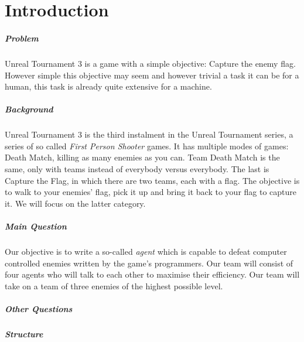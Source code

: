 \chapter*{Introduction}
\paragraph{Problem}
Unreal Tournament 3 is a game with a simple objective: Capture the enemy flag. However simple this objective may seem and however trivial a task it can be for a human, this task is already quite extensive for a machine.
\paragraph{Background}
Unreal Tournament 3 is the third instalment in the Unreal Tournament series, a series of so called \emph{First Person Shooter} games. It has multiple modes of games: Death Match, killing as many enemies as you can. Team Death Match is the same, only with teams instead of everybody versus everybody. The last is Capture the Flag, in which there are two teams, each with a flag. The objective is to walk to your enemies' flag, pick it up and bring it back to your flag to capture it. We will focus on the latter category.
\paragraph{Main Question}
Our objective is to write a so-called \emph{agent} which is capable to defeat computer controlled enemies written by the game's programmers. Our team will consist of four agents who will talk to each other to maximise their efficiency. Our team will take on a team of three enemies of the highest possible level.
\paragraph{Other Questions}
\paragraph{Structure}